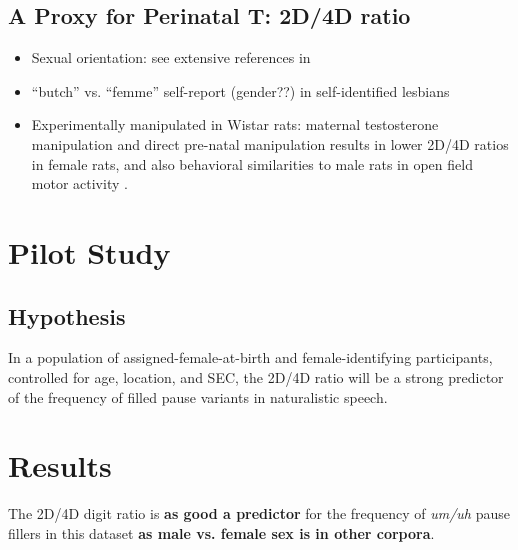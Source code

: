 \documentclass[a0,portrait]{a0poster}
\begin{document}
\begin{multicols}{2}
\subsection{A Proxy for Perinatal T: 2D/4D ratio}


\begin{itemize}
	\item Sexual orientation: see extensive references in \citet{balthazart2011}
	\item ``butch'' vs. ``femme'' self-report (gender??) in self-identified lesbians \citep{brownetal2002}
	\item Experimentally manipulated in Wistar rats: maternal testosterone manipulation and direct pre-natal manipulation results in lower 2D/4D ratios in female rats, and also behavioral similarities to male rats in open field motor activity \citep{talarovicovaetal2009}.
\end{itemize}


\section*{Pilot Study}

\subsection{Hypothesis}

In a population of assigned-female-at-birth and female-identifying participants, controlled for age, location, and SEC, the 2D/4D ratio will be a strong predictor of the frequency of filled pause variants in naturalistic speech.




\section*{Results}

The 2D/4D digit ratio is \textbf{as good a predictor} for the frequency of \textsl{um/uh} pause fillers in this dataset \textbf{as male vs. female sex is in other corpora}.


\end{multicols}
\end{document}
